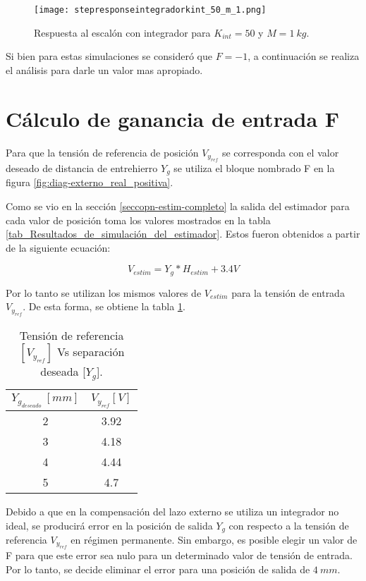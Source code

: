 \begin{figure}[H]
	\centering
	\texttt{[image: stepresponseintegradorkint\_50\_m\_1.png]}
	\caption{Respuesta al escalón con integrador para $K_{int} =50$ y $M = 1 \:kg$.}
	\label{fig:respuesta-al-escalon-con-k-50-M-1}
\end{figure}

Si bien para estas simulaciones se consideró que $F=-1$, a continuación se realiza el análisis para darle un valor mas apropiado.

\section{Cálculo de ganancia de entrada F}

Para que la tensión de referencia de posición $V_{y_{ref}}$ se corresponda con el valor deseado de distancia de entrehierro $Y_g$ se utiliza el bloque nombrado F en la figura \ref{fig:diag-externo_real_positiva}. 

Como se vio en la sección \ref{seccopn-estim-completo} la salida del estimador para cada valor de posición toma los  valores mostrados en la tabla \ref{tab_Resultados_de_simulación_del_estimador}. Estos fueron obtenidos a partir de la siguiente ecuación:

\begin{equation}
	V_{estim}=Y_g*H_{estim}+3.4V
\end{equation}


Por lo tanto se utilizan los mismos valores de $V_{estim}$ para la tensión de entrada $V_{y_{ref}}$. De esta forma, se obtiene la tabla \ref{tension-ref-vs-separacion-deseada}.

\begin{table}[H]
	\begin{center}
		\begin{tabular}{| c | c |}
			\hline
			$Y_{g_{deseado}}\:[mm]$ & $V_{y_{ref}}[V]$\\ \hline
			2 &	3.92 \\ \hline
			3 & 4.18\\ \hline
			4 & 4.44 \\ \hline
			5 & 4.7\\ \hline
		\end{tabular}
		\caption{Tensión de referencia $[V_{y_{ref}}]$ Vs separación deseada [$Y_g$].}
		\label{tension-ref-vs-separacion-deseada}
	\end{center}
\end{table}

Debido a que en la compensación del lazo externo se utiliza un integrador no ideal, se producirá error en la posición de salida $Y_g$ con respecto a la tensión de referencia  $V_{y_{ref}}$ en régimen permanente. Sin embargo, es posible elegir un valor de F para que este error sea nulo para un determinado valor de tensión de entrada. Por lo tanto, se decide eliminar el error para una posición de salida de $4\:mm$.

